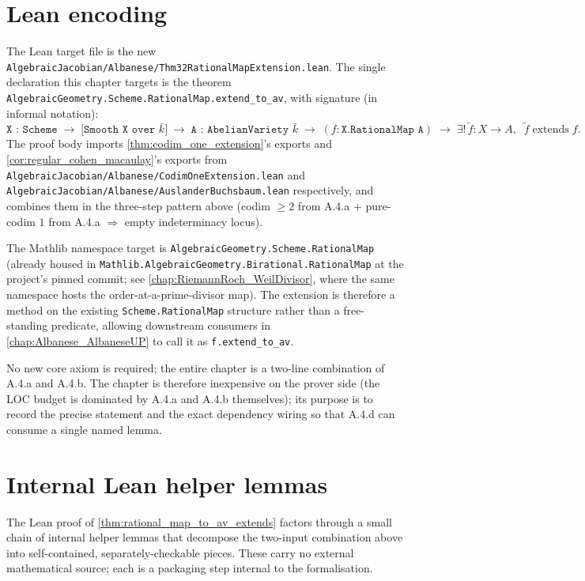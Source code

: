 \section{Lean encoding}
\label{sec:thm32_lean_encoding}

The Lean target file is the new
\texttt{AlgebraicJacobian/Albanese/Thm32RationalMapExtension.lean}. The single declaration
this chapter targets is the theorem
\texttt{AlgebraicGeometry.Scheme.RationalMap.extend\_to\_av}, with signature (in informal
notation):
\[
  \texttt{X : Scheme} \;\to\; \texttt{[Smooth X over \(\bar k\)]} \;\to\;
  \texttt{A : AbelianVariety \(\bar k\)} \;\to\;
  (f : \texttt{X.RationalMap A}) \;\to\;
  \exists ! \, \widetilde f \colon X \to A, \;\; \widetilde f \;\text{extends}\; f.
\]
The proof body imports \cref{thm:codim_one_extension}'s exports and
\cref{cor:regular_cohen_macaulay}'s exports from
\texttt{AlgebraicJacobian/Albanese/CodimOneExtension.lean} and
\texttt{AlgebraicJacobian/Albanese/AuslanderBuchsbaum.lean} respectively, and combines them
in the three-step pattern above (codim \(\geq 2\) from A.4.a + pure-codim \(1\) from A.4.a
\(\Rightarrow\) empty indeterminacy locus).

The Mathlib namespace target is
\texttt{AlgebraicGeometry.Scheme.RationalMap} (already housed in
\texttt{Mathlib.AlgebraicGeometry.Birational.RationalMap} at the project's pinned commit;
see \cref{chap:RiemannRoch_WeilDivisor}, where the same namespace hosts the
order-at-a-prime-divisor map). The extension is therefore a method on the existing
\texttt{Scheme.RationalMap} structure rather than a free-standing predicate, allowing
downstream consumers in \cref{chap:Albanese_AlbaneseUP} to call it as
\texttt{f.extend\_to\_av}.

No new core axiom is required; the entire chapter is a two-line combination of A.4.a and
A.4.b. The chapter is therefore inexpensive on the prover side (the LOC budget is dominated
by A.4.a and A.4.b themselves); its purpose is to record the precise statement and the
exact dependency wiring so that A.4.d can consume a single named lemma.

\section{Internal Lean helper lemmas}
\label{sec:thm32_lean_helpers}

The Lean proof of \cref{thm:rational_map_to_av_extends} factors through a small
chain of internal helper lemmas that decompose the two-input combination above
into self-contained, separately-checkable pieces. These carry no external
mathematical source; each is a packaging step internal to the formalisation.

